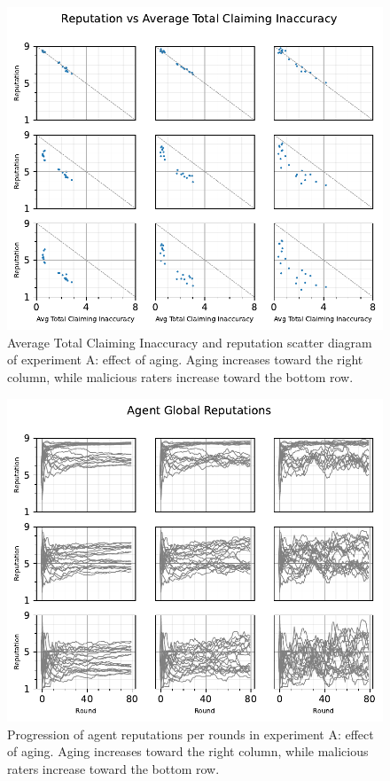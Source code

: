 \documentclass[%
    ]{\PathToTumTemplate/thesis/tum_thesis}
\begin{document}
\begin{figure}[]
  \begin{center}
        \includegraphics[width=0.75\linewidth]	{../results/a/AvgTotClaimInaccuracyAndReputationScatter_joined.pdf}
    \caption{
    Average Total Claiming Inaccuracy and reputation scatter diagram of experiment A: effect of aging.
    Aging increases toward the right column, while malicious raters increase toward the bottom row.
    }
    \label{fig:res_a_scatter}
  \end{center}
\end{figure}

\begin{figure}[]
  \begin{center}
        \includegraphics[width=0.75\linewidth]	{../results/a/ReputationsPerRounds_joined.pdf}
    \caption{
 	Progression of agent reputations per rounds in experiment A: effect of aging.
    Aging increases toward the right column, while malicious raters increase toward the bottom row.
    }
    \label{fig:res_a_reps}
  \end{center}
\end{figure}
\end{document}
